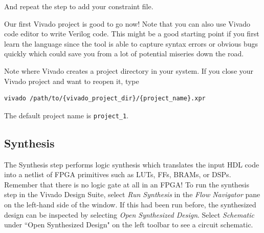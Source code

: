 \documentclass[11pt]{article}
\begin{document}
And repeat the step to add your constraint file.

\begin{center}
\end{center}

Our first Vivado project is good to go now! Note that you can also use Vivado code editor to write Verilog code. This might be a good starting point if you first learn the language since the tool is able to capture syntax errors or obvious bugs quickly which could save you from a lot of potential miseries down the road.

\begin{center}
\end{center}

Note where Vivado creates a project directory in your system. If you close your Vivado project and want to reopen it, type

\begin{verbatim}
vivado /path/to/{vivado_project_dir}/{project_name}.xpr
\end{verbatim}

The default project name is \texttt{project\_1}.

\subsection{Synthesis}
The Synthesis step performs logic synthesis which translates the input HDL code into a netlist of FPGA primitives such as LUTs, FFs, BRAMs, or DSPs. Remember that there is no logic gate at all in an FPGA! To run the synthesis step in the Vivado Design Suite, select \emph{Run Synthesis} in the \emph{Flow Navigator} pane on the left-hand side of the window. If this had been run before, the synthesized design can be inspected by selecting \emph{Open Synthesized Design}. Select \emph{Schematic} under ``Open Synthesized Design" on the left toolbar to see a circuit schematic.
\end{document}
